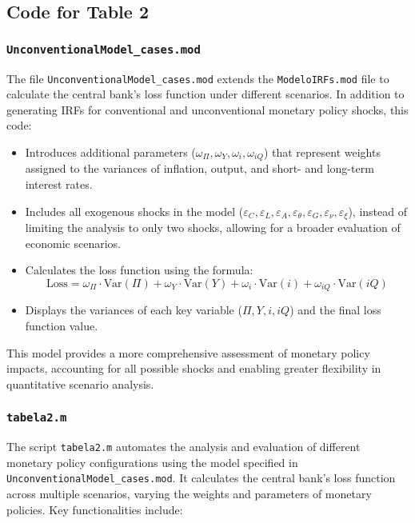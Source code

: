 \documentclass[12pt]{article}
\begin{document}
\subsection{Code for Table 2}

\subsubsection{\texttt{UnconventionalModel\_cases.mod}}

The file \texttt{UnconventionalModel\_cases.mod} extends the \texttt{ModeloIRFs.mod} file to calculate the central bank's loss function under different scenarios. In addition to generating IRFs for conventional and unconventional monetary policy shocks, this code:

\begin{itemize}
    \item Introduces additional parameters (\(\omega_\Pi, \omega_Y, \omega_i, \omega_{iQ}\)) that represent weights assigned to the variances of inflation, output, and short- and long-term interest rates.
    \item Includes all exogenous shocks in the model (\(\varepsilon_C, \varepsilon_L, \varepsilon_A, \varepsilon_\theta, \varepsilon_G, \varepsilon_\nu, \varepsilon_\xi\)), instead of limiting the analysis to only two shocks, allowing for a broader evaluation of economic scenarios.
    \item Calculates the loss function using the formula:
    \[
    \text{Loss} = \omega_\Pi \cdot \text{Var}(\Pi) + \omega_Y \cdot \text{Var}(Y) + \omega_i \cdot \text{Var}(i) + \omega_{iQ} \cdot \text{Var}(iQ)
    \]
    \item Displays the variances of each key variable (\(\Pi, Y, i, iQ\)) and the final loss function value.
\end{itemize}

This model provides a more comprehensive assessment of monetary policy impacts, accounting for all possible shocks and enabling greater flexibility in quantitative scenario analysis.


\subsubsection{\texttt{tabela2.m}}

The script \texttt{tabela2.m} automates the analysis and evaluation of different monetary policy configurations using the model specified in \texttt{UnconventionalModel\_cases.mod}. It calculates the central bank's loss function across multiple scenarios, varying the weights and parameters of monetary policies. Key functionalities include:
\end{document}
